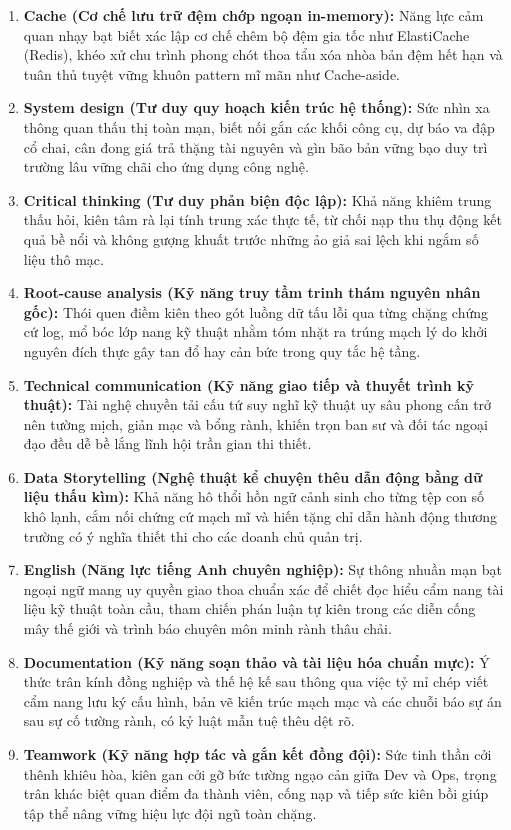 \begin{enumerate}
  xót trước lộ trình, mô tuýt lặp, cũng như tần suất thao tác thói quen
  tra cứu, cẩu rà lệnh truy đọc hay chìm ghi của bài toán doanh nghiệp
  trước giờ kèn mốc chọn loại database.
\item
  \textbf{Cache (Cơ chế lưu trữ đệm chớp ngoạn in-memory):} Năng lực cảm
  quan nhạy bạt biết xác lập cơ chế chêm bộ đệm gia tốc như ElastiCache
  (Redis), khéo xử chu trình phong chót thoa tẩu xóa nhòa bản đệm hết
  hạn và tuân thủ tuyệt vững khuôn pattern mĩ mãn như Cache-aside.
\item
  \textbf{System design (Tư duy quy hoạch kiến trúc hệ thống):} Sức nhìn
  xa thông quan thấu thị toàn mạn, biết nối gắn các khối công cụ, dự báo
  va đập cổ chai, cân đong giá trả thặng tài nguyên và gìn bão bản vững
  bạo duy trì trường lâu vững chãi cho ứng dụng công nghệ.
\item
  \textbf{Critical thinking (Tư duy phản biện độc lập):} Khả năng khiêm
  trung thấu hỏi, kiên tâm rà lại tính trung xác thực tế, từ chối nạp
  thu thụ động kết quả bề nổi và không gượng khuất trước những ảo giả
  sai lệch khi ngắm số liệu thô mạc.
\item
  \textbf{Root-cause analysis (Kỹ năng truy tầm trinh thám nguyên nhân
  gốc):} Thói quen điềm kiên theo gót luồng dữ tấu lỗi qua từng chặng
  chứng cứ log, mổ bóc lớp nang kỹ thuật nhằm tóm nhặt ra trúng mạch lý
  do khởi nguyên đích thực gây tan đổ hay cản bức trong quy tắc hệ tầng.
\item
  \textbf{Technical communication (Kỹ năng giao tiếp và thuyết trình kỹ
  thuật):} Tài nghệ chuyền tải cấu tứ suy nghĩ kỹ thuật uy sâu phong cấn
  trở nên tường mịch, giản mạc và bổng rành, khiến trọn ban sư và đối
  tác ngoại đạo đều dễ bề lắng lĩnh hội trần gian thi thiết.
\item
  \textbf{Data Storytelling (Nghệ thuật kể chuyện thêu dẫn động bằng dữ
  liệu thấu kìm):} Khả năng hô thổi hồn ngữ cảnh sinh cho từng tệp con
  số khô lạnh, cắm nối chứng cứ mạch mĩ và hiến tặng chỉ dẫn hành động
  thương trường có ý nghĩa thiết thi cho các doanh chủ quản trị.
\item
  \textbf{English (Năng lực tiếng Anh chuyên nghiệp):} Sự thông nhuần
  mạn bạt ngoại ngữ mang uy quyền giao thoa chuẩn xác để chiết đọc hiểu
  cẩm nang tài liệu kỹ thuật toàn cầu, tham chiến phán luận tự kiên
  trong các diễn cống mây thế giới và trình báo chuyên môn minh rành
  thâu chải.
\item
  \textbf{Documentation (Kỹ năng soạn thảo và tài liệu hóa chuẩn mực):}
  Ý thức trân kính đồng nghiệp và thế hệ kế sau thông qua việc tỷ mỉ
  chép viết cẩm nang lưu ký cấu hình, bản vẽ kiến trúc mạch mạc và các
  chuỗi báo sự án sau sự cố tường rành, có kỷ luật mẫn tuệ thêu dệt rõ.
\item
  \textbf{Teamwork (Kỹ năng hợp tác và gắn kết đồng đội):} Sức tinh thần
  cởi thênh khiêu hòa, kiên gan cởi gỡ bức tường ngạo cản giữa Dev và
  Ops, trọng trân khác biệt quan điểm đa thành viên, cống nạp và tiếp
  sức kiên bồi giúp tập thể nâng vững hiệu lực đội ngũ toàn chặng.
\end{enumerate}

